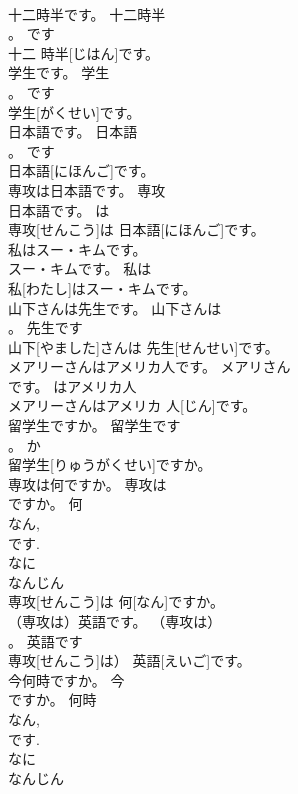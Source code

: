 \documentclass[8pt]{extreport}
\begin{document}
\begin{CJK}{UTF8}{min}
\\	十二時半です。	十二時半
\\	。	です	
\\	十二 時半[じはん]です。	
\\	学生です。	学生
\\	。	です	
\\	学生[がくせい]です。	
\\	日本語です。	日本語
\\	。	です	
\\	日本語[にほんご]です。	
\\	専攻は日本語です。	専攻
\\	日本語です。	は	
\\	専攻[せんこう]は 日本語[にほんご]です。	
\\	私はスー・キムです。	
\\	スー・キムです。	私は	
\\	私[わたし]はスー・キムです。	
\\	山下さんは先生です。	山下さんは
\\	。	先生です	
\\	山下[やました]さんは 先生[せんせい]です。	
\\	メアリーさんはアメリカ人です。	メアリさん
\\	です。	はアメリカ人	
\\	メアリーさんはアメリカ 人[じん]です。	
\\	留学生ですか。	留学生です
\\	。	か	
\\	留学生[りゅうがくせい]ですか。	
\\	専攻は何ですか。	専攻は
\\	ですか。	何	
\\	なん, 
\\	です. 
\\	なに 
\\	なんじん 
\\	専攻[せんこう]は 何[なん]ですか。	
\\	（専攻は）英語です。	（専攻は）
\\	。	英語です	
\\	専攻[せんこう]は） 英語[えいご]です。	
\\	今何時ですか。	今
\\	ですか。	何時	
\\	なん, 
\\	です. 
\\	なに 
\\	なんじん 

\end{CJK}
\end{document}
